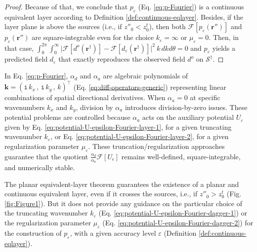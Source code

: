 \begin{proof}
	Because of that, we conclude that $p_{\varepsilon}$ (Eq. \ref{eq:p-Fourier})
	is a continuous equivalent layer according to Definition \ref{def:continuous-eqlayer}. 
	Besides, if the layer plane is above the sources (i.e., if $z''_{0} < z^{t}_{0}$), then both 
	$\mathcal{F} [ p_{\varepsilon}(\mathbf{r}'') ]$ and $p_{\varepsilon}(\mathbf{r}'')$ are square-integrable
	even for the choice $k_{\varepsilon} = \infty$ or $\mu_{\varepsilon} = 0$. Then, in that case, 
	$\int_{0}^{2\pi} \int_{0}^{\infty} 
	\vert \mathcal{F} [ d^{o}(\mathbf{r}^{\dagger}) ] - \mathcal{F} [d_{\varepsilon}(\mathbf{r}^{\dagger}) ] \vert^{2} \: k \, dkd\theta 
	= 0$ and $p_{\varepsilon}$ yields a predicted field $d_{\varepsilon}$ that exactly reproduces the observed field $d^{o}$ 
	on $\mathcal{S}^{\dagger}$.
\end{proof}

\begin{remark}
	\label{rm:remark0}
	In Eq. \ref{eq:p-Fourier}, $\alpha_{d}$ and $\alpha_{a}$ are algebraic polynomials of 
	$\mathbf{k} = ( \mathtt{i} \, k_{x} \, , \, \mathtt{i} \, k_{y} \, , \, k)^{\top}$ (Eq. \ref{eq:diff-operators-generic})
	representing linear combinations of spatial directional derivatives.
	When $\alpha_{a} = 0$ at specific wavenumbers $k_{x}$ and $k_{y}$, division by $\alpha_{a}$ introduces division-by-zero 
	issues. These potential problems are controlled because $\alpha_{a}$ acts on the auxiliary potential 
	$U_{\varepsilon}$ given by Eq. \ref{eq:potential-U-epsilon-Fourier-layer-1}, for a given truncating wavenumber $k_{\varepsilon}$, 
	or Eq. \ref{eq:potential-U-epsilon-Fourier-layer-2}, for a given regularization parameter $\mu_{\varepsilon}$. 
	These truncation/regularization approaches guarantee that the quotient $\tfrac{\alpha_{d}}{\alpha_{a}} \mathcal{F}[U_\epsilon]$ remains 
	well-defined, square-integrable, and numerically stable.
\end{remark}
	
\begin{remark}
	\label{rm:remark1}
	The planar equivalent-layer theorem guarantees the existence of a planar and continuous equivalent layer, even if
	it crosses the sources, i.e., if $z''_{0} > z^{t}_{0}$ (Fig. \ref{fig:Figure1}).
	But it does not provide any guidance on the particular choice of the 
	truncating wavenumber $k_{\varepsilon}$ (Eq. \ref{eq:potential-U-epsilon-Fourier-dagger-1}) or the 
	regularization parameter $\mu_{\varepsilon}$ (Eq. \ref{eq:potential-U-epsilon-Fourier-dagger-2}) 
	for the construction of $p_{\varepsilon}$, with a given accuracy level 
	$\varepsilon$ (Definition \ref{def:continuous-eqlayer}).
\end{remark}

